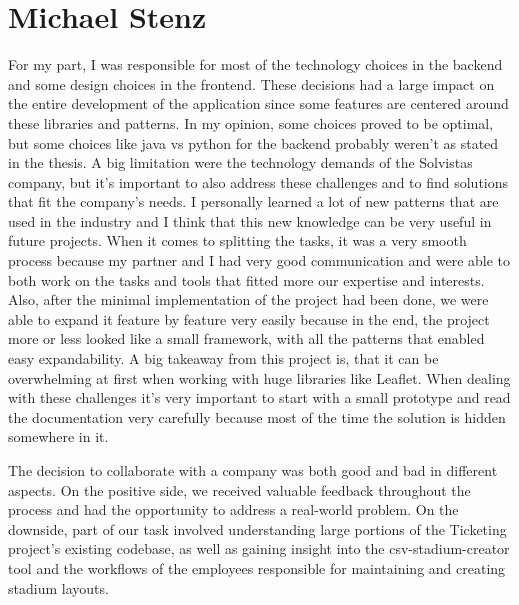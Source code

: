\section{Michael Stenz}
For my part, I was responsible for most of the technology choices in the backend and some design choices in the frontend. These decisions had a large impact on the entire development of the application since some features are centered around these libraries and patterns. In my opinion, some choices proved to be optimal, but some choices like java vs python for the backend probably weren't as stated in the thesis. A big limitation were the technology demands of the Solvistas company, but it's important to also address these challenges and to find solutions that fit the company's needs. I personally learned a lot of new patterns that are used in the industry and I think that this new knowledge can be very useful in future projects. When it comes to splitting the tasks, it was a very smooth process because my partner and I had very good communication and were able to both work on the tasks and tools that fitted more our expertise and interests. Also, after the minimal implementation of the project had been done, we were able to expand it feature by feature very easily because in the end, the project more or less looked like a small framework, with all the patterns that enabled easy expandability. A big takeaway from this project is, that it can be overwhelming at first when working with huge libraries like Leaflet. When dealing with these challenges it's very important to start with a small prototype and read the documentation very carefully because most of the time the solution is hidden somewhere in it.

The decision to collaborate with a company was both good and bad in different aspects. On the positive side, we received valuable feedback throughout the process and had the opportunity to address a real-world problem. On the downside, part of our task involved understanding large portions of the Ticketing project's existing codebase, as well as gaining insight into the csv-stadium-creator tool and the workflows of the employees responsible for maintaining and creating stadium layouts.